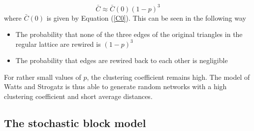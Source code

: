 \documentclass[11 pt , letterpaper , twoside , openright]{book}
\begin{document}
\begin{equation}
	\bar{C} \approx \bar{C}(0)(1-p)^3
\end{equation} 
where $\bar{C}(0)$ is given by Equation (\ref{C0}). This can be seen in the following way
\begin{itemize}
	\item The probability that none of the three edges of the original triangles in the regular lattice are rewired is $(1-p)^3$
	\item The probability that edges are rewired back to each other is negligible
\end{itemize}
For rather small values of $p$, the clustering coefficient remains high. The model of Watts and Strogatz is thus able to generate random networks with a high clustering coefficient and short average distances.


\subsection{The stochastic block model}
\end{document}
